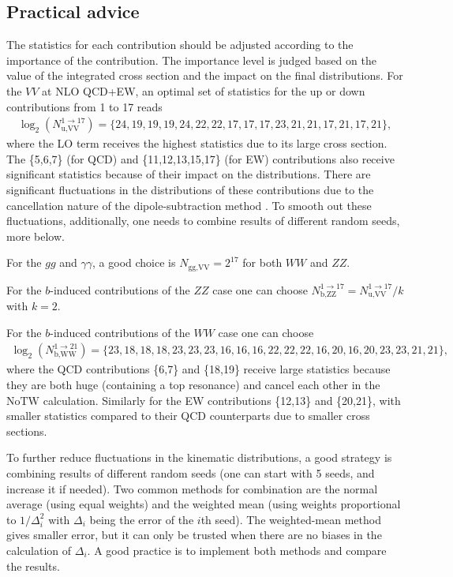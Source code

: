 \documentclass[english,12pt]{article}
\begin{document}
\subsection{Practical advice}
\label{sec:advice}
The statistics for each contribution should be adjusted according to the importance of the contribution. 
The importance level is judged based on the value of the integrated cross section and the impact on the final distributions.  
For the $VV$ at NLO QCD+EW, an optimal set of statistics for the up or down contributions from 1 to 17 reads
\begin{align}
\log_2 (N_\text{u,VV}^{1\to 17})=\{24,19,19,19,24,22,22,17,17,17,23,21,21,17,21,17,21\},
\end{align}
where the LO term receives the highest statistics due to its large cross section.
The \{5,6,7\} (for QCD) and \{11,12,13,15,17\} (for EW) contributions also receive significant statistics because 
of their impact on the distributions. There are significant fluctuations in the distributions of these contributions 
due to the cancellation nature of the dipole-subtraction method \cite{Catani:1996vz,Dittmaier:1999mb}. 
To smooth out these fluctuations, additionally, one needs to combine results of different random seeds, more below.

For the $gg$ and $\gamma\gamma$, a good choice is $N_\text{gg,VV} = 2^{17}$ for both $WW$ and $ZZ$. 

For the $b$-induced contributions of the $ZZ$ case one can choose $N_\text{b,ZZ}^{1\to 17}=N_\text{u,VV}^{1\to 17}/k$ 
with $k=2$.

For the $b$-induced contributions of the $WW$ case one can choose
\begin{align}
\log_2 (N_\text{b,WW}^{1\to 21})=\{23,18,18,18,23,23,23,16,16,16,22,22,22,16,20,16,20,23,23,21,21\},
\end{align}
where the QCD contributions \{6,7\} and \{18,19\} receive large statistics because they are both huge (containing 
a top resonance) and cancel each other in the $\text{NoTW}$ calculation. 
Similarly for the EW contributions \{12,13\} and \{20,21\}, with smaller statistics compared to their QCD counterparts 
due to smaller cross sections.

To further reduce fluctuations in the kinematic distributions, a good strategy is combining results of different 
random seeds (one can start with 5 seeds, and increase it if needed). Two common methods for combination are 
the normal average (using equal weights) and the weighted mean (using weights proportional to $1/\Delta_i^2$ with 
$\Delta_i$ being the error of the $i$th seed). The weighted-mean method gives smaller error, but it can only 
be trusted when there are no biases in the calculation of $\Delta_i$. A good practice is to implement both methods and compare 
the results.
\end{document}

